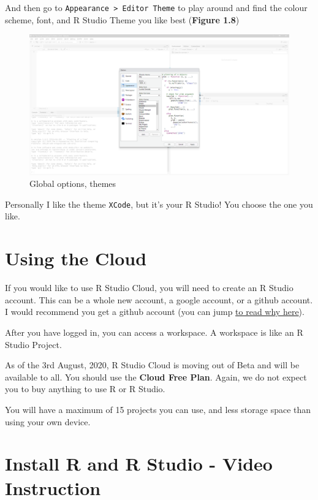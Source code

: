\documentclass[
]{book}
\begin{document}
And then go to \texttt{Appearance\ \textgreater{}\ Editor\ Theme} to play around and find the colour scheme, font, and R Studio Theme you like best (\textbf{Figure 1.8})

\begin{figure}

{\centering \includegraphics{images/02_install/rstud08} 

}

\caption{Global options, themes}\label{fig:unnamed-chunk-13}
\end{figure}

Personally I like the theme \texttt{XCode}, but it's your R Studio! You choose the one you like.

\hypertarget{install_rsc}{%
\section{Using the Cloud}\label{install_rsc}}

If you would like to use R Studio Cloud, you will need to create an R Studio account. This can be a whole new account, a google account, or a github account. I would recommend you get a github account (you can jump \protect\hyperlink{github}{to read why here}).

After you have logged in, you can access a workspace. A workspace is like an R Studio Project.

As of the 3rd August, 2020, R Studio Cloud is moving out of Beta and will be available to all. You should use the \textbf{Cloud Free Plan}. Again, we do not expect you to buy anything to use R or R Studio.

You will have a maximum of 15 projects you can use, and less storage space than using your own device.

\hypertarget{install_vids}{%
\section{Install R and R Studio - Video Instruction}\label{install_vids}}
\end{document}

